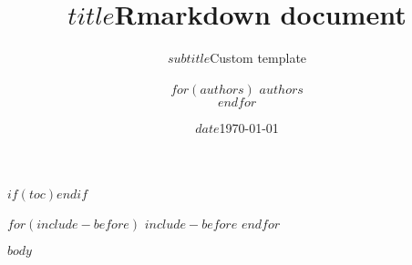\documentclass[a4paper, 12pt]{article}
\title{$title$}
\title{Rmarkdown document}
\subtitle{$subtitle$}
\subtitle{Custom template}
\author{$for(authors)$ \textsc{$authors$}\\ $endfor$}
\institute{$institute$}
\institute{Université catholique de Louvain}
\date{$date$}
\date{\today}
\begin{document}
    \maketitle
    $if(toc)$\tableofcontents$endif$
    \newpage
    
    $for(include-before)$
        $include-before$
    $endfor$
    
    
    $body$
\end{document}

